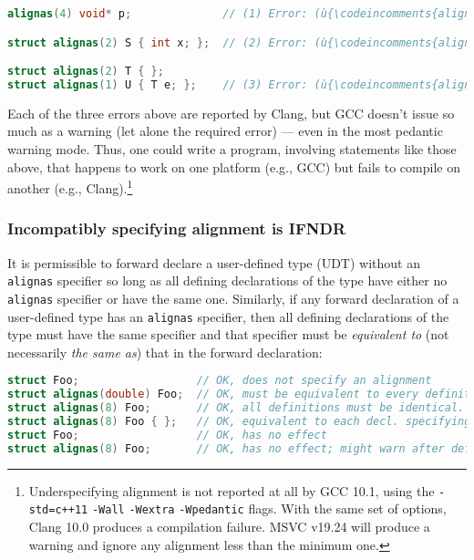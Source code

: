 \begin{lstlisting}[language=C++]
alignas(4) void* p;              // (1) Error: (ù{\codeincomments{alignas(4)}}ù) is below minimum, 8.

struct alignas(2) S { int x; };  // (2) Error: (ù{\codeincomments{alignas(2)}}ù) is below minimum, 4.

struct alignas(2) T { };
struct alignas(1) U { T e; };    // (3) Error: (ù{\codeincomments{alignas(1)}}ù) is below minimum, 2.
\end{lstlisting}
    
\noindent Each of the three errors above are reported by Clang, but GCC
doesn't issue so much as a warning (let alone the required error) ---
even in the most pedantic warning mode. Thus, one could write a program,
involving statements like those above, that happens to work on one
platform (e.g., GCC) but fails to compile on another (e.g.,
Clang).{\cprotect\footnote{Underspecifying alignment is not reported at
all by GCC 10.1, using the
\texttt{-std=c++11} \texttt{-Wall} \texttt{-Wextra} \mbox{\texttt{-Wpedantic}}
flags. With the same set of options, Clang 10.0 produces a compilation
failure. MSVC v19.24 will produce a warning and ignore any alignment
  less than the minimum one.}}

\subsubsection[Incompatibly specifying alignment is \textbf{IFNDR}]{Incompatibly specifying alignment is \textbf{IFNDR}}\label{incompatibly-specifying-alignment-is-ifndr}

It is permissible to forward declare a user-defined type (UDT)
without an \texttt{alignas} specifier so long as all defining
declarations of the type have either no \texttt{alignas} specifier or
have the same one. Similarly, if any forward declaration of a
user-defined type has an \texttt{alignas} specifier, then all defining
declarations of the type must have the same specifier and that specifier
must be \emph{equivalent to} (not necessarily \emph{the same as}) that
in the forward declaration:

\begin{lstlisting}[language=C++]
struct Foo;                  // OK, does not specify an alignment
struct alignas(double) Foo;  // OK, must be equivalent to every definition
struct alignas(8) Foo;       // OK, all definitions must be identical.
struct alignas(8) Foo { };   // OK, equivalent to each decl. specifying (ù{\codeincomments{alignas}}ù)
struct Foo;                  // OK, has no effect
struct alignas(8) Foo;       // OK, has no effect; might warn after definition
\end{lstlisting}
    
